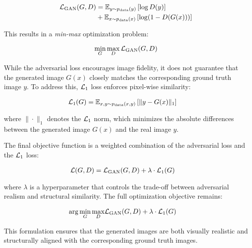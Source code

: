 \begin{align}
    \mathcal{L}_{\text{GAN}}(G,D) &= \mathbb{E}_{y \sim p_{\text{data}}(y)} 
    \left[ \log D(y) \right]  \nonumber \\ 
    &+ \mathbb{E}_{x \sim p_{\text{data}}(x)} 
    \left[ \log (1 - D(G(x))) \right]
\end{align}

This results in a \emph{min-max} optimization problem:

\begin{equation}
    \min_G \max_D \mathcal{L}_{\text{GAN}}(G,D)
\end{equation}

While the adversarial loss encourages image fidelity, it does not guarantee that the generated image \( G(x) \) closely matches the corresponding ground truth image \( y \). 
To address this, $\mathcal{L}_1$ loss enforces pixel-wise similarity:

\begin{align}
    \mathcal{L}_{1}(G) &= \mathbb{E}_{x,y \sim p_{\text{data}}(x,y)} 
    \left[ \| y - G(x) \|_1 \right]
\end{align}

where \( \| \cdot \|_1 \) denotes the $\mathcal{L}_1$ norm, which minimizes the absolute differences between the generated image \( G(x) \) and the real image \( y \).

The final objective function is a weighted combination of the adversarial loss and the $\mathcal{L}_1$ loss:

\begin{align}
    \mathcal{L}(G,D) &= \mathcal{L}_{\text{GAN}}(G,D) + \lambda \cdot \mathcal{L}_1(G)
\end{align}

where \( \lambda \) is a hyperparameter that controls the trade-off between adversarial realism and structural similarity. The full optimization objective remains:

\begin{align}
    \arg \min_G \max_D & \mathcal{L}_{\text{GAN}}(G,D) + \lambda \cdot \mathcal{L}_1(G)
\end{align}

This formulation ensures that the generated images are both visually realistic and structurally aligned with the corresponding ground truth images.

